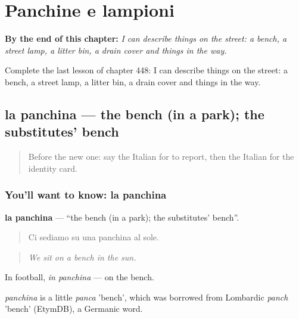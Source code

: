 
\chapter{Panchine e lampioni}
\label{ch:it-panchine-e-lampioni}

\begin{chapteropening}
\textbf{By the end of this chapter:} \emph{I can describe things on the street: a bench, a street lamp, a litter bin, a drain cover and things in the way.}

Complete the last lesson of chapter 448: I can describe things on the street: a bench, a street lamp, a litter bin, a drain cover and things in the way.
\end{chapteropening}

\section[la panchina]{la panchina — the bench (in a park); the substitutes' bench}

\label{lesson:IT-C448-panchina}



\begin{quote}
Before the new one: say the Italian for to report, then the Italian for the identity card.
\end{quote}

\subsection*{You'll want to know: la panchina}
\textbf{la panchina} — \textquotedblleft{}the bench (in a park); the substitutes' bench\textquotedblright{}.

\begin{quote}
Ci sediamo su una panchina al sole.
\end{quote}

\begin{quote}
\emph{We sit on a bench in the sun.}
\end{quote}

In football, \emph{in panchina} — on the bench.

\begin{cousinweb}
\emph{panchina} is a little \emph{panca} 'bench', which was borrowed from Lombardic \emph{panch} 'bench' (EtymDB), a Germanic word.
\end{cousinweb}

